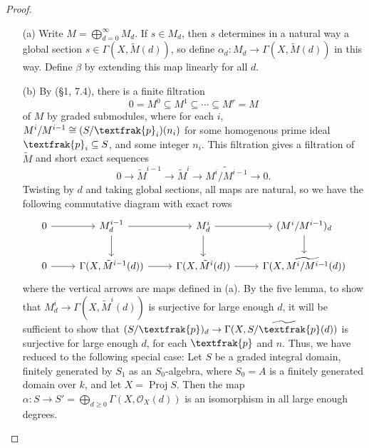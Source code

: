 \documentclass{article}
\newcommand{\goth}[1]{\textfrak{#1}}
\newcommand{\fO}{\mathcal{O}}
\DeclareMathOperator{\proj}{Proj}
\begin{document}
\begin{enumerate} [label=\textbf{\arabic*.}, leftmargin=0em]
\begin{proof} $ $ \vspace{0pt}
    \begin{itemize} [leftmargin=0cm]
        \item[(a)] Write $M = \bigoplus_{d = 0}^\infty M_d$. If $s \in M_d$, then $s$ determines in a natural way a global section $s \in \Gamma(X, \tilde{M}(d))$, so define $\alpha_d : M_d \to \Gamma(X, \tilde{M}(d))$ in this way. Define $\beta$ by extending this map linearly for all $d$.

        \item[(b)] By (\S 1, 7.4), there is a finite filtration
        \begin{equation*}
            0 = M^0 \subseteq M^1 \subseteq \cdots \subseteq M^r = M
        \end{equation*}
        of $M$ by graded submodules, where for each $i$, $M^i / M^{i - 1} \cong (S / \goth{p}_i)(n_i)$ for some homogenous prime ideal $\goth{p}_i \subseteq S$, and some integer $n_i$. This filtration gives a filtration of $\tilde{M}$ and short exact sequences
        \begin{equation*}
            0 \to \tilde{M}^{i - 1} \to \tilde{M}^i \to \widetilde{M^i / M^{i - 1}} \to 0.
        \end{equation*}
        Twisting by $d$ and taking global sections, all maps are natural, so we have the following commutative diagram with exact rows
        \[ \begin{tikzcd}
            0 \arrow[r] & M_d^{i-1} \arrow[d] \arrow[r]         & M_d^i \arrow[d] \arrow[r]         & (M^i/M^{i-1})_d \arrow[d]             \\
            0 \arrow[r] & \Gamma(X, \tilde{M}^{i-1}(d)) \arrow[r] & \Gamma(X,\tilde{M}^i(d)) \arrow[r] & \Gamma(X, \widetilde{M^i/M^{i-1}}(d))
            \end{tikzcd} \]
        where the vertical arrows are maps defined in (a). By the five lemma, to show that $M_d^i \to \Gamma(X, \tilde{M}^i(d))$ is surjective for large enough $d$, it will be sufficient to show that $(S/\goth{p})_d \to \Gamma(X, \widetilde{S/\goth{p}}(d))$ is surjective for large enough $d$, for each $\goth{p}$ and $n$.  Thus, we have reduced to the following special case: Let $S$ be a graded integral domain, finitely generated by $S_1$ as an $S_0$-algebra, where $S_0 = A$ is a finitely generated domain over $k$, and let $X = \proj{S}$. Then the map $\alpha : S \to S' = \bigoplus_{d \geq 0} \Gamma(X, \fO_X(d))$ is an isomorphism in all large enough degrees.


\end{itemize}
\end{proof}
\end{enumerate}
\end{document}
